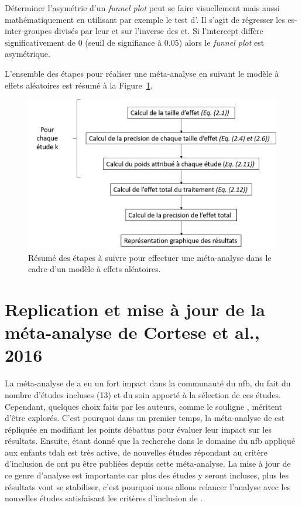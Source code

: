Déterminer l'asymétrie d'un \textit{funnel plot} peut se faire visuellement mais aussi mathématiquement en utilisant par exemple le test d'\citet{Egger1997}. 
Il s'agit de régresser les \gls{es}-inter-groupes divisés par leur \gls{et} sur l'inverse des \gls{et}. Si l'intercept diffère significativement de 
0 (seuil de signifiance à 0.05) alors le \textit{funnel plot} est asymétrique.

L'ensemble des étapes pour réaliser une méta-analyse en suivant le modèle à effets aléatoires est résumé à la Figure~\ref{Figure:pipeline_meta_analyse}.

\begin{figure}[h!]
  \centering
	\includegraphics[width=1.0\linewidth]{figures/chapter-2/pipeline-perform-meta-analysis} 
  \caption{Résumé des étapes à suivre pour effectuer une méta-analyse dans le cadre d'un modèle à effets aléatoires.}
  \label{Figure:pipeline_meta_analyse}
\end{figure}

\section{Replication et mise à jour de la méta-analyse de Cortese et al., 2016} 

La méta-analyse de \citet{Cortese2016} a eu un fort impact dans la communauté du \gls{nfb}, du fait du nombre d'études incluses (13) et 
du soin apporté à la sélection de ces études. Cependant, quelques choix faits par les auteurs, comme le souligne \citet{Micoulaud2016}, méritent d'être explorés.
C'est pourquoi dans un premier temps, la méta-analyse de \citet{Cortese2016} est répliquée en modifiant les points débattus pour évaluer leur impact sur les
résultats. Ensuite, étant donné que la recherche dans le domaine du \gls{nfb} appliqué aux enfants \gls{tdah} est très active, de nouvelles études répondant au 
critère d'inclusion de \citet{Cortese2016} ont pu être publiées depuis cette méta-analyse. La mise à jour de ce genre d'analyse est importante
car plus des études y seront incluses, plus les résultats vont se stabiliser, c'est pourquoi nous allons relancer l'analyse avec les nouvelles études
satisfaisant les critères d'inclusion de \citet{Cortese2016}.

